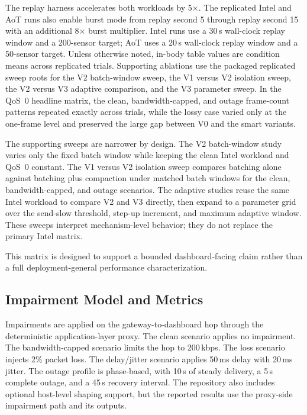 \documentclass[sigconf,authorversion,nonacm]{acmart}
\begin{document}
The replay harness accelerates both workloads by 5$\times$. The replicated Intel and AoT runs also enable burst mode from replay second 5 through replay second 15 with an additional 8$\times$ burst multiplier. Intel runs use a 30\,s wall-clock replay window and a 200-sensor target; AoT uses a 20\,s wall-clock replay window and a 50-sensor target. Unless otherwise noted, in-body table values are condition means across replicated trials. Supporting ablations use the packaged replicated sweep roots for the V2 batch-window sweep, the V1 versus V2 isolation sweep, the V2 versus V3 adaptive comparison, and the V3 parameter sweep. In the QoS~0 headline matrix, the clean, bandwidth-capped, and outage frame-count patterns repeated exactly across trials, while the lossy case varied only at the one-frame level and preserved the large gap between V0 and the smart variants.

The supporting sweeps are narrower by design. The V2 batch-window study varies only the fixed batch window while keeping the clean Intel workload and QoS~0 constant. The V1 versus V2 isolation sweep compares batching alone against batching plus compaction under matched batch windows for the clean, bandwidth-capped, and outage scenarios. The adaptive studies reuse the same Intel workload to compare V2 and V3 directly, then expand to a parameter grid over the send-slow threshold, step-up increment, and maximum adaptive window. These sweeps interpret mechanism-level behavior; they do not replace the primary Intel matrix.

This matrix is designed to support a bounded dashboard-facing claim rather than a full deployment-general performance characterization.

\subsection{Impairment Model and Metrics}

Impairments are applied on the gateway-to-dashboard hop through the deterministic application-layer proxy. The clean scenario applies no impairment. The bandwidth-capped scenario limits the hop to 200\,kbps. The loss scenario injects 2\% packet loss. The delay/jitter scenario applies 50\,ms delay with 20\,ms jitter. The outage profile is phase-based, with 10\,s of steady delivery, a 5\,s complete outage, and a 45\,s recovery interval. The repository also includes optional host-level shaping support, but the reported results use the proxy-side impairment path and its outputs.
\end{document}
